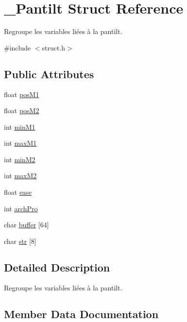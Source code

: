 \hypertarget{struct___pantilt}{}\section{\+\_\+\+Pantilt Struct Reference}
\label{struct___pantilt}


Regroupe les variables liées à la pantilt.  




{\ttfamily \#include $<$struct.\+h$>$}

\subsection*{Public Attributes}
\begin{DoxyCompactItemize}
\item 
float \hyperlink{struct___pantilt_a176de6650a3e2cd0b1a368341113c6be}{pos\+M1}
\item 
float \hyperlink{struct___pantilt_a3db337f00d74f2f7d2d4a566fa752864}{pos\+M2}
\item 
int \hyperlink{struct___pantilt_adf84d6bc2232f3b4bc0f083ba9fb7d6e}{min\+M1}
\item 
int \hyperlink{struct___pantilt_a7a297f4584b4716b650e36bd7b52b933}{max\+M1}
\item 
int \hyperlink{struct___pantilt_a699ffbddf43d385ee176a11ed0824483}{min\+M2}
\item 
int \hyperlink{struct___pantilt_a3d40173704b6bee3917c36ad86e4d506}{max\+M2}
\item 
float \hyperlink{struct___pantilt_a8cdf704a9fb3b595305ec85fa3b6c0e6}{ease}
\item 
int \hyperlink{struct___pantilt_ad01a4e572846f68131a375e708a825aa}{arch\+Pro}
\item 
char \hyperlink{struct___pantilt_aa3d78142802cbd9374bc905f81539a37}{buffer} \mbox{[}64\mbox{]}
\item 
char \hyperlink{struct___pantilt_ac1ef92bf2930646a3950cbe0b426b30d}{str} \mbox{[}8\mbox{]}
\end{DoxyCompactItemize}


\subsection{Detailed Description}
Regroupe les variables liées à la pantilt. 

\subsection{Member Data Documentation}

